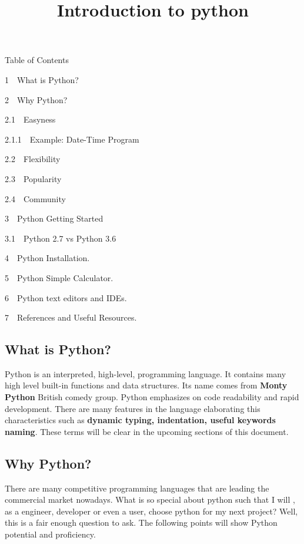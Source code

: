\documentclass[11pt]{article}
\title{Introduction to python}
\begin{document}
    
    
    \maketitle
    
    

    
    Table of Contents{}

{{1~~}What is Python?}

{{2~~}Why Python?}

{{2.1~~}Easyness}

{{2.1.1~~}Example: Date-Time Program}

{{2.2~~}Flexibility}

{{2.3~~}Popularity}

{{2.4~~}Community}

{{3~~}Python Getting Started}

{{3.1~~}Python 2.7 vs Python 3.6}

{{4~~}Python Installation.}

{{5~~}Python Simple Calculator.}

{{6~~}Python text editors and IDEs.}

{{7~~}References and Useful Resources.}

    \subsection{What is Python?}\label{what-is-python}

    Python is an interpreted, high-level, programming language. It contains
many high level built-in functions and data structures. Its name comes
from \textbf{Monty Python} British comedy group. Python emphasizes on
code readability and rapid development. There are many features in the
language elaborating this characteristics such as \textbf{dynamic
typing, indentation, useful keywords naming}. These terms will be clear
in the upcoming sections of this document.

    \subsection{Why Python?}\label{why-python}

    There are many competitive programming languages that are leading the
commercial market nowadays. What is so special about python such that I
will , as a engineer, developer or even a user, choose python for my
next project? Well, this is a fair enough question to ask. The following
points will show Python potential and proficiency.
\end{document}

